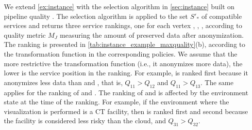 \vspace{0.5em}

\begin{example}
  We extend \cref{ex:instance} with the selection algorithm in \cref{sec:instance} built on pipeline quality \q. The selection algorithm is applied to the set $S'_*$ of compatible services and returns three service rankings, one for each vertex , , , according to quality metric $M_J$ measuring the amount of preserved data after anonymization. The ranking is presented in \cref{tab:instance_example_maxquality}(b), according to the transformation function in the corresponding policies.
  We assume that the more restrictive the transformation function (i.e., it anonymizes more data), the lower is the service position in the ranking.
  For example,  is ranked first because it anonymizes less data than  and , that is, $Q_{11}$$>$$Q_{12}$ and $Q_{11}$$>$$Q_{13}$.  The same applies for the ranking of  and .
  The ranking of  and  is affected by the environment state at the time of the ranking.   For example, if the environment where the visualization is performed is a CT facility, then  is ranked first and  second because the facility is considered less risky than the cloud, and $Q_{31}$$>$$Q_{32}$.
\end{example}

